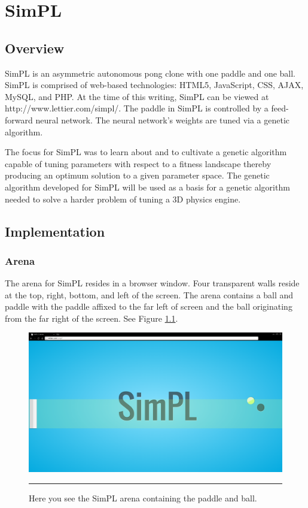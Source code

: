 \chapter{SimPL}

\label{Chapter3}

\section{Overview}


SimPL is an asymmetric autonomous pong clone with one paddle and one ball. SimPL is comprised of web-based technologies: HTML5, JavaScript, CSS, AJAX, MySQL, and PHP. At the time of this writing, SimPL can be viewed at http://www.lettier.com/simpl/. The paddle in SimPL is controlled by a feed-forward neural network. The neural network's weights are tuned via a genetic algorithm. 

The focus for SimPL was to learn about and to cultivate a genetic algorithm capable of tuning parameters with respect to a fitness landscape thereby producing an optimum solution to a given parameter space. The genetic algorithm developed for SimPL will be used as a basis for a genetic algorithm needed to solve a harder problem of tuning a 3D physics engine. 

\section{Implementation}

\subsection{Arena}

The arena for SimPL resides in a browser window. Four transparent walls reside at the top, right, bottom, and left of the screen. The arena contains a ball and paddle with the paddle affixed to the far left of screen and the ball originating from the far right of the screen. See Figure \ref{fig:arena}.

\begin{figure}[htbp]  
  \centering
  \includegraphics[scale=0.2]{../Figures/Chapter3/arena.png}
  \rule{35em}{0.5pt}
  \caption[SimPL Arena]{Here you see the SimPL arena containing the paddle and ball.}
  \label{fig:arena}
\end{figure}

